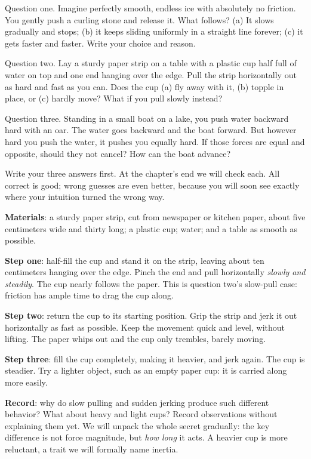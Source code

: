 Question one. Imagine perfectly smooth, endless ice with absolutely no friction. You gently push a curling stone and release it. What follows? (a) It slows gradually and stops; (b) it keeps sliding uniformly in a straight line forever; (c) it gets faster and faster. Write your choice and reason.

Question two. Lay a sturdy paper strip on a table with a plastic cup half full of water on top and one end hanging over the edge. Pull the strip horizontally out as hard and fast as you can. Does the cup (a) fly away with it, (b) topple in place, or (c) hardly move? What if you pull slowly instead?

Question three. Standing in a small boat on a lake, you push water backward hard with an oar. The water goes backward and the boat forward. But however hard you push the water, it pushes you equally hard. If those forces are equal and opposite, should they not cancel? How can the boat advance?

Write your three answers first. At the chapter's end we will check each. All correct is good; wrong guesses are even better, because you will soon see exactly where your intuition turned the wrong way.


\begin{experiment}
\textbf{Materials}: a sturdy paper strip, cut from newspaper or kitchen paper, about five centimeters wide and thirty long; a plastic cup; water; and a table as smooth as possible.

\textbf{Step one}: half-fill the cup and stand it on the strip, leaving about ten centimeters hanging over the edge. Pinch the end and pull horizontally \emph{slowly and steadily}. The cup nearly follows the paper. This is question two's slow-pull case: friction has ample time to drag the cup along.

\textbf{Step two}: return the cup to its starting position. Grip the strip and jerk it out horizontally as fast as possible. Keep the movement quick and level, without lifting. The paper whips out and the cup only trembles, barely moving.

\textbf{Step three}: fill the cup completely, making it heavier, and jerk again. The cup is steadier. Try a lighter object, such as an empty paper cup: it is carried along more easily.

\textbf{Record}: why do slow pulling and sudden jerking produce such different behavior? What about heavy and light cups? Record observations without explaining them yet. We will unpack the whole secret gradually: the key difference is not force magnitude, but \emph{how long} it acts. A heavier cup is more reluctant, a trait we will formally name inertia.
\end{experiment}


